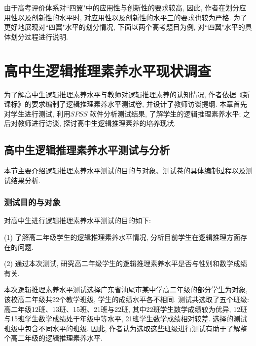 \documentclass[acaddeg]{Style/SCNUThesisV3}
\begin{document}
由于高考评价体系对``四翼"中的应用性与创新性的要求较高, 因此, 作者在划分应用性以及创新性的水平时, 对应用性以及创新性的水平三的要求也较为严格. 为了更好地展现对``四翼"水平的划分情况, 下面以两个高考题目为例, 对``四翼"水平的具体划分过程进行说明.

  

\chapter{高中生逻辑推理素养水平现状调查}\label{Cha: 4}
\setcounter{equation}{0}
为了解高中生逻辑推理素养水平与教师对逻辑推理素养的认知情况, 作者依据《新课标》的要求编制了逻辑推理素养水平测试卷, 并设计了教师访谈提纲. 本章首先对学生进行测试, 利用$SPSS$ 软件分析测试结果, 了解学生的逻辑推理素养水平; 之后对教师进行访谈, 探讨高中生逻辑推理素养的培养现状.

\section{高中生逻辑推理素养水平测试与分析}
本节主要介绍逻辑推理素养水平测试的目的与对象、测试卷的具体编制过程以及测试结果分析.

\subsection{测试目的与对象}
对高中生进行逻辑推理素养水平测试的目的如下: 

(1) 了解高二年级学生的逻辑推理素养水平情况, 分析目前学生在逻辑推理方面存在的问题.

(2) 通过本次测试, 研究高二年级学生的逻辑推理素养水平是否与性别和数学成绩有关.

本次逻辑推理素养水平测试选择广东省汕尾市某中学高二年级的部分学生为对象, 该校高二年级共22个教学班级, 学生的成绩水平各不相同. 测试共选取了五个班级: 高二年级12班、13班、15班、21班与22班, 其中22班学生数学成绩较为优异, 12班与15班学生数学成绩处于年级中等水平, 21班学生数学成绩相对较差. 选择的测试班级中包含不同水平的班级. 因此, 作者认为选取这些班级进行测试有助于了解整个高二年级的逻辑推理素养水平.



 
\end{document}
